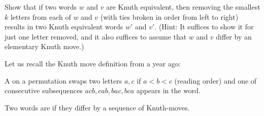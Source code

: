 \documentclass[12pt]{memoir}
\begin{document}
\begin{Ej}[7(a)]
    Show that if two words $w$ and $v$ are Knuth equivalent, then removing the smallest $k$
    letters from each of $w$ and $v$ (with ties broken in order from left to right) results in two Knuth
    equivalent words $w'$ and $v'$. (Hint: It suffices to show it for just one letter removed, and it also
    suffices to assume that $w$ and $v$ differ by an elementary Knuth move.)
\end{Ej}

Let us recall the Knuth move definition from a year ago:

\begin{Def}
    A  on a permutation swaps two letters $a,c$ if $a<b<c$ (reading order) and one of consecutive subsequences $acb,cab,bac,bca$ appears in the word.\par 
    Two words are  if they differ by a sequence of Knuth-moves.
\end{Def}
\end{document}
